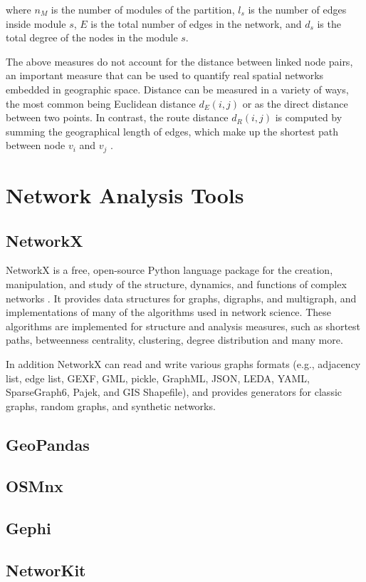 where $n_M$ is the number of modules of the partition, $l_s$ is the number of edges inside module $s$, $E$ is the total number of edges in the network, and $d_s$ is the total degree of the nodes in the module $s$.

The above measures do not account for the distance between linked node pairs, an important measure that can be used to quantify real spatial networks embedded in geographic space. Distance can be measured in a variety of ways, the most common being Euclidean distance $d_E(i, j)$ or as the direct distance between two points. In contrast, the route distance $d_R(i, j)$ is computed by summing the geographical length of edges, which make up the shortest path between node $v_i$ and $v_j$ \cite{anderson_2020}.

\section{Network Analysis Tools}

\subsection{NetworkX}

NetworkX is a free, open-source Python language package for the creation, manipulation, and study of the structure, dynamics, and functions of complex networks \cite{hagberg-schult-swart-networkx_2008, networkx_doc}. It provides data structures for graphs, digraphs, and multigraph, and implementations of many of the algorithms used in network science. These algorithms are implemented for structure and analysis measures, such as shortest paths, betweenness centrality, clustering, degree distribution and many more.

In addition NetworkX can read and write various graphs formats (e.g., adjacency list, edge list, GEXF, GML, pickle, GraphML, JSON, LEDA, YAML, SparseGraph6, Pajek, and GIS Shapefile), and provides generators for classic graphs, random graphs, and synthetic networks.


\subsection{GeoPandas}



\subsection{OSMnx}

\subsection{Gephi}

\subsection{NetworKit}
